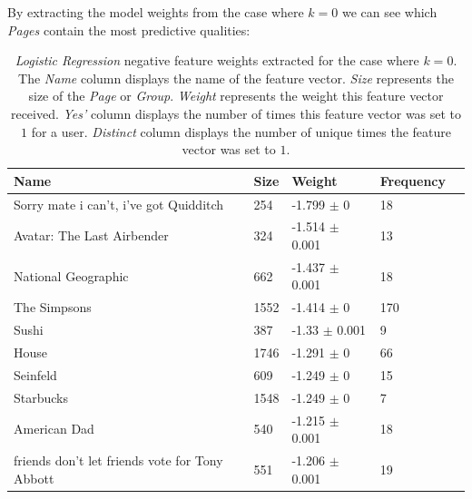 By extracting the model weights from the case where $k=0$ we can see which \emph{Pages} contain the most predictive qualities:
\begin{table}[h]
\begin{minipage}[b]{1.0\textwidth}
\centering
  \begin{tabular}{|l|l|l|l|l|} %
  \hline
  \textbf{Name} & \textbf{Size} & \textbf{Weight} & \textbf{Frequency} \\ \hline
Sorry mate i can't, i've got Quidditch  & 254 & -1.799 $\pm$ 0 & 18 \\ \hline
Avatar: The Last Airbender  & 324 & -1.514 $\pm$ 0.001 & 13 \\ \hline
National Geographic  & 662 & -1.437 $\pm$ 0.001 & 18 \\ \hline
The Simpsons  & 1552 & -1.414 $\pm$ 0 & 170 \\ \hline
Sushi  & 387 & -1.33 $\pm$ 0.001 & 9 \\ \hline
House  & 1746 & -1.291 $\pm$ 0 & 66 \\ \hline
Seinfeld  & 609 & -1.249 $\pm$ 0 & 15 \\ \hline
Starbucks  & 1548 & -1.249 $\pm$ 0 & 7 \\ \hline
American Dad  & 540 & -1.215 $\pm$ 0.001 & 18 \\ \hline
friends don't let friends vote for Tony Abbott  & 551 & -1.206 $\pm$ 0.001 & 19 \\ \hline
  \end{tabular}
  \caption{\emph{Logistic Regression} negative feature weights extracted for the case where $k=0$. The \emph{Name} column displays the name of the feature vector.
                        \emph{Size} represents the size of the \emph{Page} or \emph{Group}.
                        \emph{Weight} represents the weight this feature vector received.  
                        \emph{Yes'} column displays the number of times this feature vector was set to $1$ for a user.
                        \emph{Distinct} column displays the number of unique times the feature vector was set to $1$.}
\end{minipage}
\end{table}

